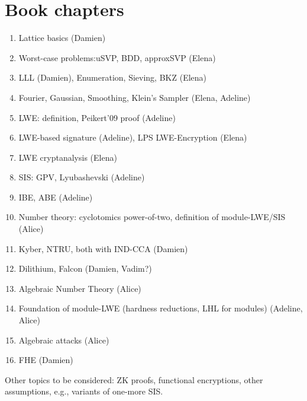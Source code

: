 \section{Book chapters}

\begin{enumerate}
	\item Lattice basics (Damien)
	\item Worst-case problems:uSVP, BDD, approxSVP (Elena)
	\item LLL (Damien), Enumeration, Sieving, BKZ (Elena)
	\item Fourier, Gaussian, Smoothing, Klein's Sampler (Elena, Adeline)
	\item LWE: definition, Peikert'09 proof (Adeline)
	\item LWE-based signature (Adeline), LPS LWE-Encryption (Elena)
	\item LWE cryptanalysis (Elena)
	\item SIS: GPV, Lyubashevski (Adeline)
	\item IBE, ABE (Adeline)
	\item Number theory: cyclotomics power-of-two, definition of module-LWE/SIS (Alice)
	\item Kyber, NTRU, both with IND-CCA (Damien)
	\item Dilithium, Falcon (Damien, Vadim?)
	\item Algebraic Number Theory (Alice)
	\item Foundation of module-LWE (hardness reductions, LHL for modules) (Adeline, Alice)
	\item Algebraic attacks (Alice)
	\item FHE (Damien)
\end{enumerate} 

Other topics to be considered: ZK proofs, functional encryptions, other assumptions, e.g., variants of one-more SIS.

